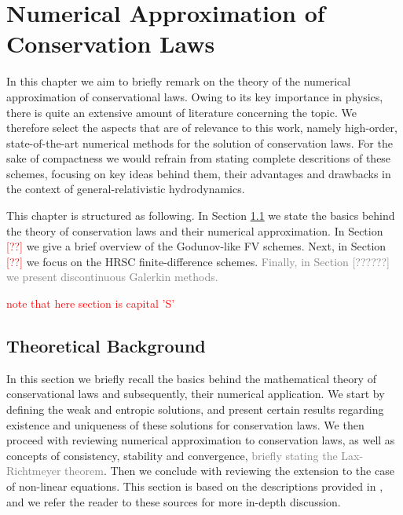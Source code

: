 
\chapter{Numerical Approximation of Conservation Laws}
\label{app:num}

In this chapter we aim to briefly remark on the theory of the numerical approximation of conservational laws. Owing to its key importance in physics, there is quite an extensive amount of literature concerning the topic. We therefore select the aspects that are of relevance to this work, namely high-order, state-of-the-art numerical methods for the solution of conservation laws. For the sake of compactness we would refrain from stating complete descritions of these schemes, focusing on key ideas behind them, their advantages and drawbacks in the context of general-relativistic hydrodynamics. 

This chapter is structured as following. In Section \ref{sec:theory:conserv_laws:theorback} we state the basics behind the theory of conservation laws and their numerical approximation. In Section \textcolor{red}{[??]} we give a brief overview of the Godunov-like \ac{FV} schemes. Next, in Section \textcolor{red}{[??]} we focus on the \ac{HRSC} finite-difference schemes. \textcolor{gray}{Finally, in Section [??????] we present discontinuous Galerkin methods.}

\textcolor{red}{note that here section is capital 'S'}



\section{Theoretical Background}
\label{sec:theory:conserv_laws:theorback}

In this section we briefly recall the basics behind the mathematical theory of conservational laws and subsequently, their numerical application. We start by defining the weak and entropic solutions, and present certain results regarding existence and uniqueness of these solutions for conservation laws. We then proceed with reviewing numerical approximation to conservation laws, as well as concepts of consistency, stability and convergence, \textcolor{gray}{briefly stating the Lax-Richtmeyer theorem}. Then we conclude with reviewing the extension to the case of non-linear equations. This section is based on the descriptions provided in \citep{LeVeque:1992,Tadmor1998}, and we refer the reader to these sources for more in-depth discussion. 


